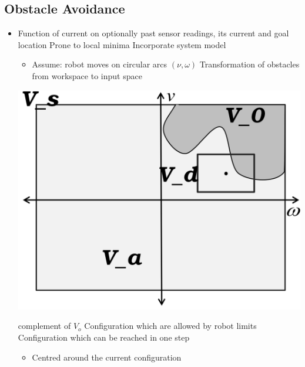 \subsection{Obstacle Avoidance}
\begin{itemize}
    \item Function of current on optionally past sensor readings, its current and goal location
    \icon Prone to local minima
    \ipro Incorporate system model
        \begin{minipage}[b]{0.5\linewidth}
            \raggedright
            \begin{itemize}
                \item Assume: robot moves on circular arcs $(\nu, \omega)$
                 Transformation of obstacles from workspace to input space
            \end{itemize}
        \end{minipage}
        \begin{minipage}[b]{0.45\linewidth}
            \includegraphics[width=0.97\linewidth]{./Figures/06_DWA.png}
        \end{minipage}
        \begin{itemize}
             complement of $V_o$
             Configuration which are allowed by robot limits
             Configuration which can be reached in one step
                \begin{itemize}
                    \item Centred around the current configuration

\end{itemize}
\end{itemize}
\end{itemize}
